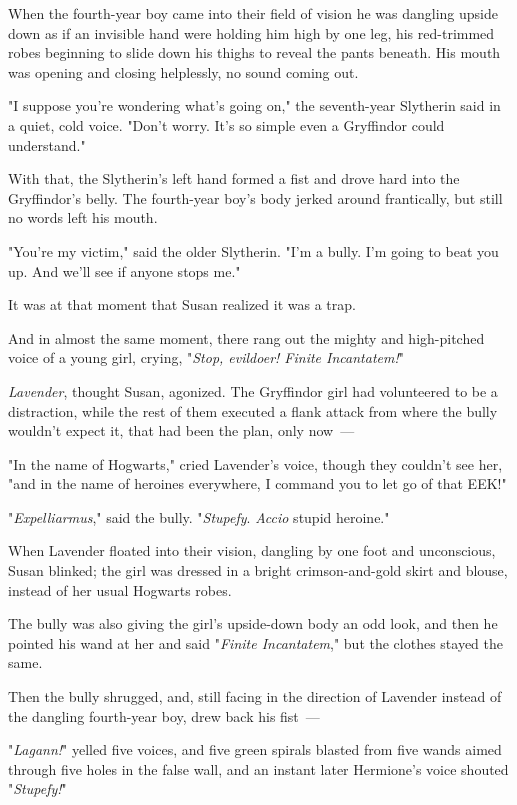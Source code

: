 When the fourth-year boy came into their field of vision he was dangling upside
down as if an invisible hand were holding him high by one leg, his red-trimmed
robes beginning to slide down his thighs to reveal the pants beneath. His mouth
was opening and closing helplessly, no sound coming out.

"I suppose you're wondering what's going on," the seventh-year Slytherin said
in a quiet, cold voice. "Don't worry. It's so simple even a Gryffindor could
understand."

With that, the Slytherin's left hand formed a fist and drove hard into the
Gryffindor's belly. The fourth-year boy's body jerked around frantically, but
still no words left his mouth.

"You're my victim," said the older Slytherin. "I'm a bully. I'm going to beat
you up. And we'll see if anyone stops me."

It was at that moment that Susan realized it was a trap.

And in almost the same moment, there rang out the mighty and high-pitched voice
of a young girl, crying, "\emph{Stop, evildoer! Finite Incantatem!}"

\emph{Lavender}, thought Susan, agonized. The Gryffindor girl had volunteered
to be a distraction, while the rest of them executed a flank attack from where
the bully wouldn't expect it, that had been the plan, only now~---

"In the name of Hogwarts," cried Lavender's voice, though they couldn't see
her, "and in the name of heroines everywhere, I command you to let go of that
EEK!"

"\emph{Expelliarmus}," said the bully. "\emph{Stupefy}. \emph{Accio} stupid
heroine."

When Lavender floated into their vision, dangling by one foot and unconscious,
Susan blinked; the girl was dressed in a bright crimson-and-gold skirt and
blouse, instead of her usual Hogwarts robes.

The bully was also giving the girl's upside-down body an odd look, and then he
pointed his wand at her and said "\emph{Finite Incantatem}," but the clothes
stayed the same.

Then the bully shrugged, and, still facing in the direction of Lavender instead
of the dangling fourth-year boy, drew back his fist~---

"\emph{Lagann!}" yelled five voices, and five green spirals blasted from five
wands aimed through five holes in the false wall, and an instant later
Hermione's voice shouted "\emph{Stupefy!}"

